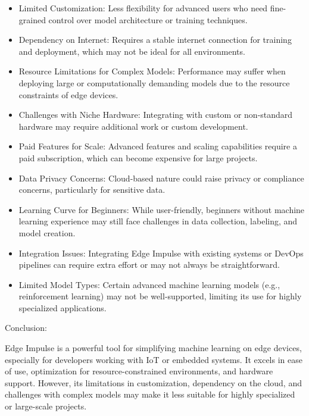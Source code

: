 \begin{itemize}
    \item Limited Customization: Less flexibility for advanced users who need fine-grained control over model architecture or training techniques.
    \item Dependency on Internet: Requires a stable internet connection for training and deployment, which may not be ideal for all environments.
    \item Resource Limitations for Complex Models: Performance may suffer when deploying large or computationally demanding models due to the resource constraints of edge devices.
    \item Challenges with Niche Hardware: Integrating with custom or non-standard hardware may require additional work or custom development.
    \item Paid Features for Scale: Advanced features and scaling capabilities require a paid subscription, which can become expensive for large projects.
    \item Data Privacy Concerns: Cloud-based nature could raise privacy or compliance concerns, particularly for sensitive data.
    \item Learning Curve for Beginners: While user-friendly, beginners without machine learning experience may still face challenges in data collection, labeling, and model creation.
    \item Integration Issues: Integrating Edge Impulse with existing systems or DevOps pipelines can require extra effort or may not always be straightforward.
    \item Limited Model Types: Certain advanced machine learning models (e.g., reinforcement learning) may not be well-supported, limiting its use for highly specialized applications.
\end{itemize}

Conclusion:

Edge Impulse is a powerful tool for simplifying machine learning on edge devices, especially for developers working with IoT or embedded systems. It excels in ease of use, optimization for resource-constrained environments, and hardware support. However, its limitations in customization, dependency on the cloud, and challenges with complex models may make it less suitable for highly specialized or large-scale projects.